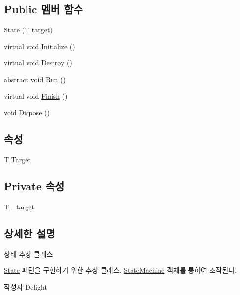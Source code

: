 \subsection*{Public 멤버 함수}
\begin{DoxyCompactItemize}
\item 
\hyperlink{class_m_c_n_1_1_state_a63bbb5cb66bc266c6bde3d3568165a3d}{State} (T target)
\item 
virtual void \hyperlink{class_m_c_n_1_1_state_a8eabaffe047e6dccd5c5d8aed7bf218a}{Initialize} ()
\item 
virtual void \hyperlink{class_m_c_n_1_1_state_a32af22a6a0a979d3b3a80225426aa839}{Destroy} ()
\item 
abstract void \hyperlink{class_m_c_n_1_1_state_a8adfea67c55997e5c0eefbae1e429f4d}{Run} ()
\item 
virtual void \hyperlink{class_m_c_n_1_1_state_a6de4f94b23916fcd05f589759da9ac3f}{Finish} ()
\item 
void \hyperlink{class_m_c_n_1_1_state_a6c53b2eda47e718ff469fd76a95cf02a}{Dispose} ()
\end{DoxyCompactItemize}
\subsection*{속성}
\begin{DoxyCompactItemize}
\item 
T \hyperlink{class_m_c_n_1_1_state_a93ba2fd920292031bd6e65b1dc505cb3}{Target}
\end{DoxyCompactItemize}
\subsection*{Private 속성}
\begin{DoxyCompactItemize}
\item 
T \hyperlink{class_m_c_n_1_1_state_ab759357c7d076cf62dd0016b743d762e}{\+\_\+target}
\end{DoxyCompactItemize}


\subsection{상세한 설명}
상태 추상 클래스 

\hyperlink{class_m_c_n_1_1_state}{State} 패턴을 구현하기 위한 추상 클래스. \hyperlink{class_m_c_n_1_1_state_machine}{State\+Machine} 객체를 통하여 조작된다. \begin{DoxyAuthor}{작성자}
Delight 
\end{DoxyAuthor}


